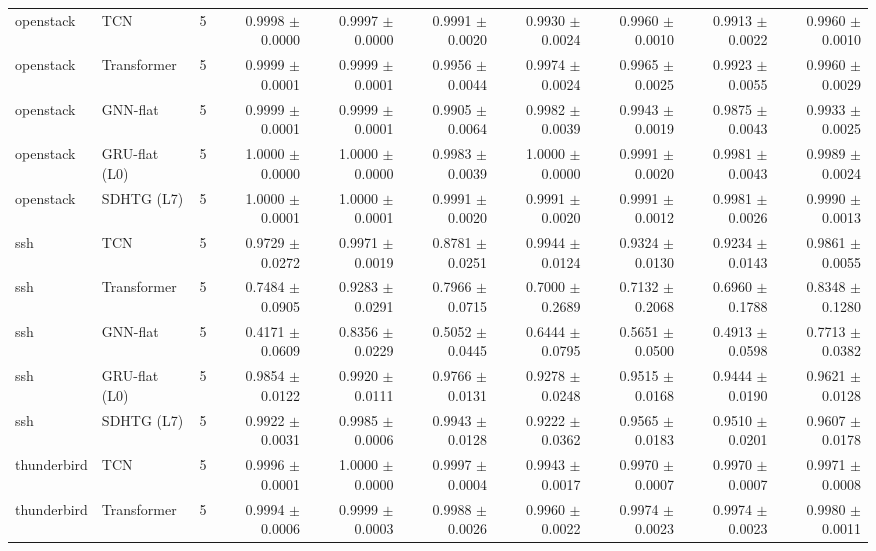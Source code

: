 \documentclass[11pt,a4paper]{article}
\begin{document}
\begin{table}[H]
{{\begin{tabular}{llcrrrrrrr}
openstack & TCN & 5 & 0.9998 $\pm$ 0.0000 & 0.9997 $\pm$ 0.0000 & 0.9991 $\pm$ 0.0020 & 0.9930 $\pm$ 0.0024 & 0.9960 $\pm$ 0.0010 & 0.9913 $\pm$ 0.0022 & 0.9960 $\pm$ 0.0010 \\
openstack & Transformer & 5 & 0.9999 $\pm$ 0.0001 & 0.9999 $\pm$ 0.0001 & 0.9956 $\pm$ 0.0044 & 0.9974 $\pm$ 0.0024 & 0.9965 $\pm$ 0.0025 & 0.9923 $\pm$ 0.0055 & 0.9960 $\pm$ 0.0029 \\
openstack & GNN-flat & 5 & 0.9999 $\pm$ 0.0001 & 0.9999 $\pm$ 0.0001 & 0.9905 $\pm$ 0.0064 & 0.9982 $\pm$ 0.0039 & 0.9943 $\pm$ 0.0019 & 0.9875 $\pm$ 0.0043 & 0.9933 $\pm$ 0.0025 \\
openstack & GRU-flat (L0) & 5 & 1.0000 $\pm$ 0.0000 & 1.0000 $\pm$ 0.0000 & 0.9983 $\pm$ 0.0039 & 1.0000 $\pm$ 0.0000 & 0.9991 $\pm$ 0.0020 & 0.9981 $\pm$ 0.0043 & 0.9989 $\pm$ 0.0024 \\
openstack & SDHTG (L7) & 5 & 1.0000 $\pm$ 0.0001 & 1.0000 $\pm$ 0.0001 & 0.9991 $\pm$ 0.0020 & 0.9991 $\pm$ 0.0020 & 0.9991 $\pm$ 0.0012 & 0.9981 $\pm$ 0.0026 & 0.9990 $\pm$ 0.0013 \\
ssh & TCN & 5 & 0.9729 $\pm$ 0.0272 & 0.9971 $\pm$ 0.0019 & 0.8781 $\pm$ 0.0251 & 0.9944 $\pm$ 0.0124 & 0.9324 $\pm$ 0.0130 & 0.9234 $\pm$ 0.0143 & 0.9861 $\pm$ 0.0055 \\
ssh & Transformer & 5 & 0.7484 $\pm$ 0.0905 & 0.9283 $\pm$ 0.0291 & 0.7966 $\pm$ 0.0715 & 0.7000 $\pm$ 0.2689 & 0.7132 $\pm$ 0.2068 & 0.6960 $\pm$ 0.1788 & 0.8348 $\pm$ 0.1280 \\
ssh & GNN-flat & 5 & 0.4171 $\pm$ 0.0609 & 0.8356 $\pm$ 0.0229 & 0.5052 $\pm$ 0.0445 & 0.6444 $\pm$ 0.0795 & 0.5651 $\pm$ 0.0500 & 0.4913 $\pm$ 0.0598 & 0.7713 $\pm$ 0.0382 \\
ssh & GRU-flat (L0) & 5 & 0.9854 $\pm$ 0.0122 & 0.9920 $\pm$ 0.0111 & 0.9766 $\pm$ 0.0131 & 0.9278 $\pm$ 0.0248 & 0.9515 $\pm$ 0.0168 & 0.9444 $\pm$ 0.0190 & 0.9621 $\pm$ 0.0128 \\
ssh & SDHTG (L7) & 5 & 0.9922 $\pm$ 0.0031 & 0.9985 $\pm$ 0.0006 & 0.9943 $\pm$ 0.0128 & 0.9222 $\pm$ 0.0362 & 0.9565 $\pm$ 0.0183 & 0.9510 $\pm$ 0.0201 & 0.9607 $\pm$ 0.0178 \\
thunderbird & TCN & 5 & 0.9996 $\pm$ 0.0001 & 1.0000 $\pm$ 0.0000 & 0.9997 $\pm$ 0.0004 & 0.9943 $\pm$ 0.0017 & 0.9970 $\pm$ 0.0007 & 0.9970 $\pm$ 0.0007 & 0.9971 $\pm$ 0.0008 \\
thunderbird & Transformer & 5 & 0.9994 $\pm$ 0.0006 & 0.9999 $\pm$ 0.0003 & 0.9988 $\pm$ 0.0026 & 0.9960 $\pm$ 0.0022 & 0.9974 $\pm$ 0.0023 & 0.9974 $\pm$ 0.0023 & 0.9980 $\pm$ 0.0011 \\

\end{tabular}}}
\end{table}
\end{document}
